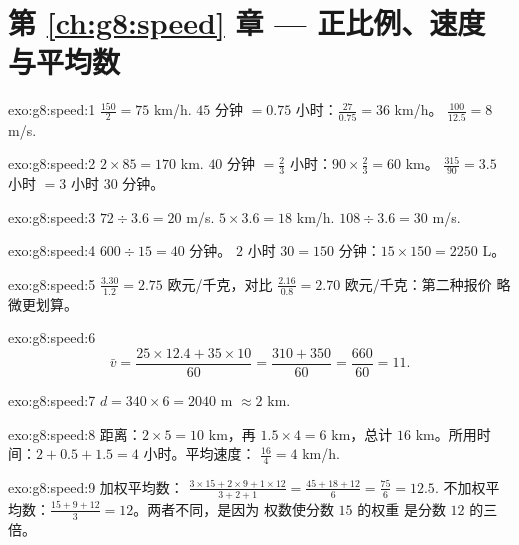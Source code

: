 \section*{第 \ref{ch:g8:speed} 章 --- 正比例、速度与平均数}

\begin{solution}{exo:g8:speed:1}
$\frac{150}{2} = 75$ km/h. \quad
$45$ 分钟 $= 0.75$ 小时：$\frac{27}{0.75} = 36$ km/h。 \quad
$\frac{100}{12.5} = 8$ m/s.
\end{solution}

\begin{solution}{exo:g8:speed:2}
$2 \times 85 = 170$ km. \quad
$40$ 分钟 $= \frac23$ 小时：$90 \times \frac23 = 60$ km。 \quad
$\frac{315}{90} = 3.5$ 小时 $= 3$ 小时 $30$ 分钟。
\end{solution}

\begin{solution}{exo:g8:speed:3}
$72 \div 3.6 = 20$ m/s. \quad
$5 \times 3.6 = 18$ km/h. \quad
$108 \div 3.6 = 30$ m/s.
\end{solution}

\begin{solution}{exo:g8:speed:4}
$600 \div 15 = 40$ 分钟。 \quad
$2$ 小时 $30 = 150$ 分钟：$15 \times 150 = 2250$ L。
\end{solution}

\begin{solution}{exo:g8:speed:5}
$\frac{3.30}{1.2} = 2.75$ 欧元/千克，对比
$\frac{2.16}{0.8} = 2.70$ 欧元/千克：第二种报价
略微更划算。
\end{solution}

\begin{solution}{exo:g8:speed:6}
\[
\bar v = \frac{25 \times 12.4 + 35 \times 10}{60}
= \frac{310 + 350}{60} = \frac{660}{60} = 11 .
\]
\end{solution}

\begin{solution}{exo:g8:speed:7}
$d = 340 \times 6 = 2040$ m $\approx 2$ km.
\end{solution}

\begin{solution}{exo:g8:speed:8}
距离：$2 \times 5 = 10$ km，再 $1.5 \times 4 = 6$ km，总计
$16$ km。所用时间：$2 + 0.5 + 1.5 = 4$ 小时。平均速度：
$\frac{16}{4} = 4$ km/h.
\end{solution}

\begin{solution}{exo:g8:speed:9}
加权平均数：
$\frac{3 \times 15 + 2 \times 9 + 1 \times 12}{3 + 2 + 1}
= \frac{45 + 18 + 12}{6} = \frac{75}{6} = 12.5$.
不加权平均数：$\frac{15 + 9 + 12}{3} = 12$。两者不同，是因为
权数使分数 $15$ 的权重
是分数 $12$ 的三倍。
\end{solution}

